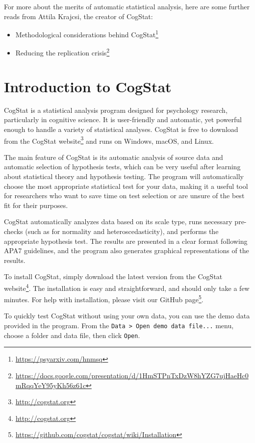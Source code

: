 \documentclass[
  11pt,
  a4paper,
  twoside,symmetric,openright]{book}
\providecommand{\tightlist}{%
  \setlength{\itemsep}{0pt}\setlength{\parskip}{0pt}}
\theoremstyle{break}
\theoremstyle{break}
\DeclareRobustCommand{\href}[2]{#2\footnote{\url{#1}}}
\begin{document}
For more about the merits of automatic statistical analysis, here are some further reads from Attila Krajcsi, the creator of CogStat:

\begin{itemize}
\tightlist
\item
  \href{https://psyarxiv.com/hnmsq}{Methodological considerations behind CogStat}
\item
  \href{https://docs.google.com/presentation/d/1HmSTPnTxDzW8hYZG7ujHaeHc0mRqqYeY95yKh56z61c}{Reducing the replication crisis}
\end{itemize}

\hypertarget{cogstatintro}{%
\chapter{Introduction to CogStat}\label{cogstatintro}}

CogStat is a statistical analysis program designed for psychology research, particularly in cognitive science. It is user-friendly and automatic, yet powerful enough to handle a variety of statistical analyses. CogStat is free to download from the \href{http://cogstat.org}{CogStat website} and runs on Windows, macOS, and Linux.

The main feature of CogStat is its automatic analysis of source data and automatic selection of hypothesis tests, which can be very useful after learning about statistical theory and hypothesis testing. The program will automatically choose the most appropriate statistical test for your data, making it a useful tool for researchers who want to save time on test selection or are unsure of the best fit for their purposes.

CogStat automatically analyzes data based on its scale type, runs necessary pre-checks (such as for normality and heteroscedasticity), and performs the appropriate hypothesis test. The results are presented in a clear format following APA7 guidelines, and the program also generates graphical representations of the results.

To install CogStat, simply download the latest version from the \href{http://cogstat.org}{CogStat website}. The installation is easy and straightforward, and should only take a few minutes. For help with installation, please visit our \href{https://github.com/cogstat/cogstat/wiki/Installation}{GitHub page}.

To quickly test CogStat without using your own data, you can use the demo data provided in the program. From the \texttt{Data\ \textgreater{}\ Open\ demo\ data\ file...} menu, choose a folder and data file, then click \texttt{Open}.
\end{document}
